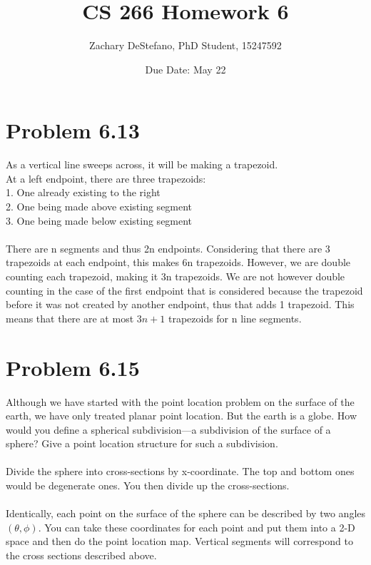 \documentclass[11pt,psfig]{article}
\begin{document}
\setlength{\parskip}{1.2ex plus0.3ex minus 0.3ex}


\thispagestyle{empty} \pagestyle{myheadings} 



\title{CS 266 Homework 6}
\author{Zachary DeStefano, PhD Student, 15247592}
\date{Due Date: May 22}

\maketitle

\vfill\eject

\section*{Problem 6.13}

As a vertical line sweeps across, it will be making a trapezoid. \\
At a left endpoint, there are three trapezoids:\\
1. One already existing to the right\\
2. One being made above existing segment\\
3. One being made below existing segment\\
\\
There are n segments and thus 2n endpoints. Considering that there are 3 trapezoids at each endpoint, this makes 6n trapezoids. However, we are double counting each trapezoid, making it 3n trapezoids. We are not however double counting in the case of the first endpoint that is considered because the trapezoid before it was not created by another endpoint, thus that adds 1 trapezoid. This means that there are at most $3n+1$ trapezoids for n line segments.

\newpage

\section*{Problem 6.15}

 Although we have started with the point location problem on the surface
of the earth, we have only treated planar point location. But the earth is
a globe. How would you define a spherical subdivision—a subdivision
of the surface of a sphere? Give a point location structure for such a
subdivision.\\
\\
Divide the sphere into cross-sections by x-coordinate. The top and bottom ones would be degenerate ones. You then divide up the cross-sections. \\
\\
Identically, each point on the surface of the sphere can be described by two angles $(\theta,\phi)$. You can take these coordinates for each point and put them into a 2-D space and then do the point location map. Vertical segments will correspond to the cross sections described above. 
\end{document}
